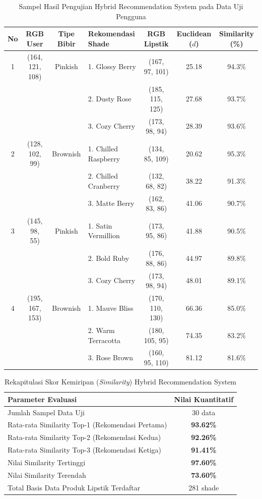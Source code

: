 \documentclass[10pt,a4paper]{article}
\begin{document}
\begin{table}[htbp]
 \centering
 \caption{Sampel Hasil Pengujian Hybrid Recommendation System pada Data Uji Pengguna}
 \label{tab:hasil_rekomendasi}
 \fontsize{8.5pt}{10.5pt}\selectfont
 \begin{tabular}{ccclccc}
 \toprule
 \textbf{No} & \textbf{RGB User} & \textbf{Tipe Bibir} & \textbf{Rekomendasi Shade} & \textbf{RGB Lipstik} & \textbf{Euclidean ($d$)} & \textbf{Similarity (\%)} \\
 \midrule
 1 & (164, 121, 108) & Pinkish & 1. Glossy Berry & (167, 97, 101) & 25.18 & 94.3\% \\
 & & & 2. Dusty Rose & (185, 115, 125) & 27.68 & 93.7\% \\
 & & & 3. Cozy Cherry & (173, 98, 94) & 28.39 & 93.6\% \\
 \midrule
 2 & (128, 102, 99) & Brownish & 1. Chilled Raspberry& (134, 85, 109) & 20.62 & 95.3\% \\
 & & & 2. Chilled Cranberry& (132, 68, 82) & 38.22 & 91.3\% \\
 & & & 3. Matte Berry & (162, 83, 86) & 41.06 & 90.7\% \\
 \midrule
 3 & (145, 98, 55) & Pinkish & 1. Satin Vermillion & (173, 95, 86) & 41.88 & 90.5\% \\
 & & & 2. Bold Ruby & (176, 88, 86) & 44.97 & 89.8\% \\
 & & & 3. Cozy Cherry & (173, 98, 94) & 48.01 & 89.1\% \\
 \midrule
 4 & (195, 167, 153) & Brownish & 1. Mauve Bliss & (170, 110, 130) & 66.36 & 85.0\% \\
 & & & 2. Warm Terracotta & (180, 105, 95) & 74.35 & 83.2\% \\
 & & & 3. Rose Brown & (160, 95, 110) & 81.12 & 81.6\% \\
 \bottomrule
 \end{tabular}
\end{table}

\begin{table}[htbp]
 \centering
 \caption{Rekapitulasi Skor Kemiripan (\textit{Similarity}) Hybrid Recommendation System}
 \label{tab:rekap_similarity}
 \fontsize{8.5pt}{11pt}\selectfont
 \begin{tabular}{lc}
 \toprule
 \textbf{Parameter Evaluasi} & \textbf{Nilai Kuantitatif} \\
 \midrule
 Jumlah Sampel Data Uji & 30 data \\
 Rata-rata Similarity Top-1 (Rekomendasi Pertama) & \textbf{93.62\%} \\
 Rata-rata Similarity Top-2 (Rekomendasi Kedua) & \textbf{92.26\%} \\
 Rata-rata Similarity Top-3 (Rekomendasi Ketiga) & \textbf{91.41\%} \\
 Nilai Similarity Tertinggi & \textbf{97.60\%} \\
 Nilai Similarity Terendah & \textbf{73.60\%} \\
 Total Basis Data Produk Lipstik Terdaftar & 281 shade \\
 \bottomrule
 \end{tabular}
\end{table}
\end{document}
